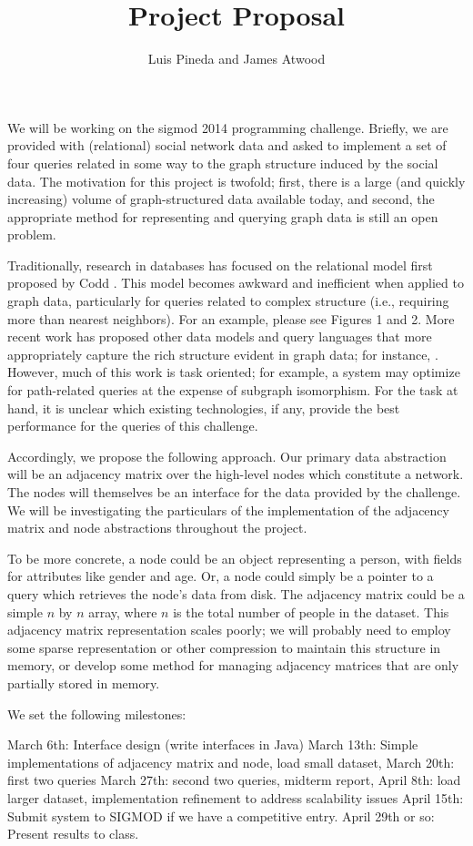 \documentclass{article}
\title{Project Proposal}
\author{
Luis Pineda and James Atwood \\
}
\begin{document}
\maketitle

We will be working on the sigmod 2014 programming challenge.  Briefly, we are provided with (relational) social network data and asked to implement a set of four queries related in some way to the graph structure induced by the social data.  The motivation for this project is twofold; first, there is a large (and quickly increasing) volume of graph-structured data available today, and second, the appropriate method for representing and querying graph data is still an open problem.

Traditionally, research in databases has focused on the relational model first proposed by Codd \cite{coddpaper}.  This model becomes awkward and inefficient when applied to graph data, particularly for queries related to complex structure (i.e., requiring more than nearest neighbors).  For an example, please see \cite{GraphQL paper} Figures 1 and 2.  More recent work has proposed other data models and query languages that more appropriately capture the rich structure evident in graph data; for instance, \cite{GraphQL paper,neo4j_paper,graphlab paper}.  However, much of this work is task oriented; for example, a system may optimize for path-related queries at the expense of subgraph isomorphism.  For the task at hand, it is unclear which existing technologies, if any, provide the best performance for the queries of this challenge.

Accordingly, we propose the following approach.  Our primary data abstraction will be an adjacency matrix over the high-level nodes which constitute a network.  The nodes will themselves be an interface for the data provided by the challenge.  We will be investigating the particulars of the implementation of the adjacency matrix and node abstractions throughout the project.

To be more concrete, a node could be an object representing a person, with fields for attributes like gender and age.  Or, a node could simply be a pointer to a query which retrieves the node's data from disk.  The adjacency matrix could be a simple $n$ by $n$ array, where $n$ is the total number of people in the dataset.  This adjacency matrix representation scales poorly; we will probably need to employ some sparse representation or other compression to maintain this structure in memory, or develop some method for managing adjacency matrices that are only partially stored in memory.

We set the following milestones:

March 6th: Interface design (write interfaces in Java)
March 13th: Simple implementations of adjacency matrix and node, load small dataset, 
March 20th: first two queries
March 27th: second two queries, midterm report,
April 8th: load larger dataset, implementation refinement to address scalability issues
April 15th: Submit system to SIGMOD if we have a competitive entry.
April 29th or so: Present results to class.
\end{document}
